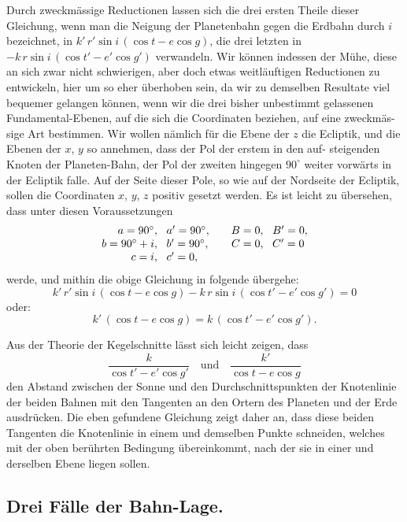 \documentclass[12pt,a4paper]{article}
\begin{document}
Durch zweckmässige Reductionen lassen sich die drei ersten Theile dieser
Gleichung, wenn man die Neigung der Planetenbahn gegen die Erdbahn durch
$i$ bezeichnet, in $k'\,r'\sin i\,(\cos t - e\cos g)$, die drei letzten in
$-k\,r\sin i\,(\cos t' - e'\cos g')$ verwandeln. Wir können indessen der Mühe,
diese an sich zwar nicht schwierigen, aber doch etwas weitläuftigen Reductionen
zu entwickeln, hier um so eher überhoben sein, da wir zu demselben Resultate
viel bequemer gelangen können, wenn wir die drei bisher unbestimmt gelassenen
Fundamental-Ebenen, auf die sich die Coordinaten beziehen, auf eine zweckmäs-
sige Art bestimmen. Wir wollen nämlich für die Ebene der $z$ die Ecliptik,
und die Ebenen der $x$, $y$ so annehmen, dass der Pol der erstem in den auf-
steigenden Knoten der Planeten-Bahn, der Pol der zweiten hingegen $90^{\circ}$
weiter vorwärts in der Ecliptik falle. Auf der Seite dieser Pole, so wie auf der
Nordseite der Ecliptik, sollen die Coordinaten $x$, $y$, $z$ positiv gesetzt werden.
Es ist leicht zu übersehen, dass unter diesen Voraussetzungen
\[
\begin{array}{r@{\;\;\;}l@{\qquad}r@{\;\;\;}l}
a = 90^{\circ}, & a' = 90^{\circ}, & B = 0, & B' = 0,\\
b = 90^{\circ}+i, & b' = 90^{\circ}, & C = 0, & C' = 0\\
c = i, & c' = 0,
\end{array}
\]
werde, und mithin die obige Gleichung in folgende übergehe:
\[
k'\,r'\sin i\,(\cos t - e\cos g) - k\,r\sin i\,(\cos t' - e'\cos g') = 0
\]
oder:
\[
k'\,(\cos t - e\cos g) = k\,(\cos t' - e'\cos g').
\]

Aus der Theorie der Kegelschnitte lässt sich leicht zeigen, dass
\[
\frac{k}{\cos t' - e'\cos g'} \quad \text{und} \quad \frac{k'}{\cos t - e\cos g}
\]
den Abstand zwischen der Sonne und den Durchschnittspunkten der Knotenlinie
der beiden Bahnen mit den Tangenten an den Ortern des Planeten und der Erde
ausdrücken. Die eben gefundene Gleichung zeigt daher an, dass diese beiden
Tangenten die Knotenlinie in einem und demselben Punkte schneiden, welches
mit der oben berührten Bedingung übereinkommt, nach der sie in einer und
derselben Ebene liegen sollen.

\subsection{Drei Fälle der Bahn-Lage.}
\end{document}
